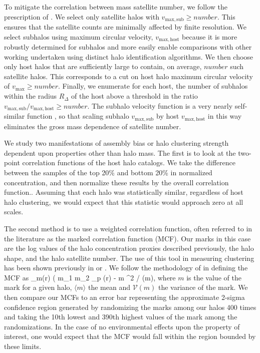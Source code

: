 \documentclass[usenatbib,usegraphicx,letterpaper]{mn2e}
\begin{document}
To mitigate the correlation between mass satellite number, 
we follow the prescription of \citet{wechsler06}. We select only satellite halos 
with $v_{\mathrm{max,sub}} \ge number$. This ensures that the satellite counts 
are minimally affected by finite resolution. We select subhalos using 
maximum circular velocity, $v_{\mathrm{max,host}}$ because it is more robustly 
determined for subhalos and more easily enable comparisons with other working 
undertaken using distinct halo identification algorithms. 
We then choose only host halos that are sufficiently 
large to contain, on average, $number$ such satellite halos. This corresponds to a cut on host halo 
maximum circular velocity of $v_{\mathrm{max}} \ge number$. Finally, we enumerate for each 
host, the number of subhalos within the radius $R_{\Delta}$ of the host above a threshold 
in the ratio $v_{\mathrm{max,sub}}/v_{\mathrm{max,host}} \ge number$. The subhalo velocity 
function is a very nearly self-similar function , so that scaling subhalo $v_{\mathrm{max,sub}}$ by 
host $v_{\mathrm{max,host}}$ in this way eliminates the 
gross mass dependence of satellite number.

We study two manifestations of assembly bias or halo clustering strength dependent upon properties other than halo mass. 
The first is to look at the two-point correlation functions of the host halo catalogs. We take the difference between the samples of the top 20\% and bottom 20\% in normalized concentration, and then normalize these results by the overall correlation function.. Assuming that each halo was statistically similar, regardless of host halo clustering, we would expect that this statistic would approach zero at all scales.

The second method is to use a weighted correlation function, often referred to in the literature as the marked correlation function (MCF). Our marks in this case are the log values of the halo concentration proxies described previously, the halo shape, and the halo satellite number. The use of this tool in measuring clustering has been shown previously in \citet{wechsler06} or \citet{harker06}. We follow the methodology of \citet{wechsler06} in defining the MCF as
\beq
{}_m(r) \equiv ( \langle m_1 m_2 \rangle_p (r) - \langle m \rangle^2 / (m),
\eeq
where $m$ is the value of the mark for a given halo, $\langle m \rangle$ the mean and $\mathcal{V}(m)$ the variance of the mark. We then compare our MCFs to an error bar representing the approximate 2-sigma confidence region generated by randomizing the marks among our halos 400 times and taking the 10th lowest and 390th highest values of the mark among the randomizations. In the case of no environmental effects upon the property of interest, one would expect that the MCF would fall within the region bounded by these limits.
\end{document}
